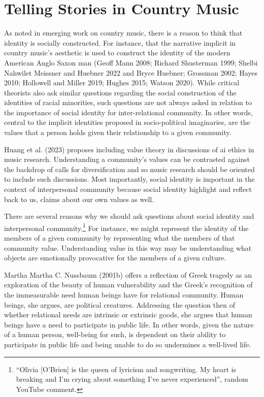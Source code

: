 \documentclass[12pt]{book}
\theoremstyle{definition}
\theoremstyle{remark}
\begin{document}
\section{Telling Stories in Country Music}\label{telling-stories-in-country-music}

As noted in emerging work on country music, there is a reason to think that identity is socially constructed. For instance, that the narrative implicit in country music's aesthetic is used to construct the identity of the modern American Anglo Saxon man (Geoff Mann 2008; Richard Shusterman 1999; Shelbi Nahwilet Meissner and Huebner 2022 and Bryce Huebner; Grossman 2002; Hayes 2010; Hollowell and Miller 2019; Hughes 2015; Watson 2020). While critical theorists also ask similar questions regarding the social construction of the identities of racial minorities, such questions are not always asked in relation to the importance of social identity for inter-relational community. In other words, central to the implicit identities proposed in socio-political imaginaries, are the values that a person holds given their relationship to a given community.

Huang et al. (2023) proposes including value theory in discussions of ai ethics in music research. Understanding a community's values can be contrasted against the backdrop of calls for diversification and so music research should be oriented to include such discussions. Most importantly, social identity is important in the context of interpersonal community because social identity highlight and reflect back to us, claims about our own values as well.

There are several reasons why we should ask questions about social identity and interpersonal community.\footnote{``Olivia {[}O'Brien{]} is the queen of lyricism and songwriting. My heart is breaking and I'm crying about something I've never experienced'', random YouTube comment.} For instance, we might represent the identity of the members of a given community by representing what the members of that community value. Understanding value in this way may be understanding what objects are emotionally provocative for the members of a given culture.

Martha Martha C. Nussbaum (2001b) offers a reflection of Greek tragedy as an exploration of the beauty of human vulnerability and the Greek's recognition of the immeasurable need human beings have for relational community. Human beings, she argues, are political creatures. Addressing the question then of whether relational needs are intrinsic or extrinsic goods, she argues that human beings have a need to participate in public life. In other words, given the nature of a human person, well-being for such, is dependent on their ability to participate in public life and being unable to do so undermines a well-lived life.
\end{document}
